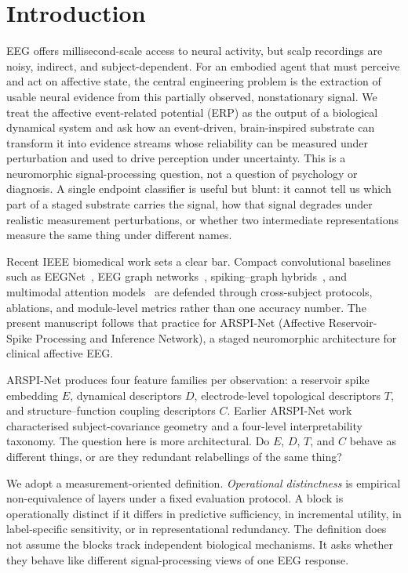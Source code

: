 \documentclass[journal]{IEEEtran}
\begin{document}
\section{Introduction}
EEG offers millisecond-scale access to neural activity, but scalp recordings are noisy, indirect, and subject-dependent. For an embodied agent that must perceive and act on affective state, the central engineering problem is the extraction of usable neural evidence from this partially observed, nonstationary signal. We treat the affective event-related potential (ERP) as the output of a biological dynamical system and ask how an event-driven, brain-inspired substrate can transform it into evidence streams whose reliability can be measured under perturbation and used to drive perception under uncertainty. This is a neuromorphic signal-processing question, not a question of psychology or diagnosis. A single endpoint classifier is useful but blunt: it cannot tell us which part of a staged substrate carries the signal, how that signal degrades under realistic measurement perturbations, or whether two intermediate representations measure the same thing under different names.

Recent IEEE biomedical work sets a clear bar. Compact convolutional baselines such as EEGNet~\cite{lawhern2018eegnet}, EEG graph networks~\cite{klepl2024gnn,klepl2023ad}, spiking--graph hybrids~\cite{gong2023sglnet}, and multimodal attention models~\cite{guo2025mma,chiang2023depression} are defended through cross-subject protocols, ablations, and module-level metrics rather than one accuracy number. The present manuscript follows that practice for ARSPI-Net (Affective Reservoir-Spike Processing and Inference Network), a staged neuromorphic architecture for clinical affective EEG.

ARSPI-Net produces four feature families per observation: a reservoir spike embedding $E$, dynamical descriptors $D$, electrode-level topological descriptors $T$, and structure--function coupling descriptors $C$. Earlier ARSPI-Net work characterised subject-covariance geometry and a four-level interpretability taxonomy. The question here is more architectural. Do $E$, $D$, $T$, and $C$ behave as different things, or are they redundant relabellings of the same thing?

We adopt a measurement-oriented definition. \emph{Operational distinctness} is empirical non-equivalence of layers under a fixed evaluation protocol. A block is operationally distinct if it differs in predictive sufficiency, in incremental utility, in label-specific sensitivity, or in representational redundancy. The definition does not assume the blocks track independent biological mechanisms. It asks whether they behave like different signal-processing views of one EEG response.
\end{document}
